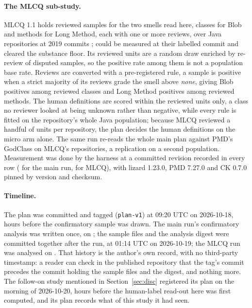 \documentclass[11pt,a4paper]{article}
\begin{document}
\paragraph{The MLCQ sub-study.} MLCQ 1.1 holds \mlcqSamples{} reviewed
samples for the two smells read here, \mlcqBlobReviewed{} classes for Blob
and \mlcqLmReviewed{} methods for Long Method, each with one or more reviews,
over \mlcqRepos{} Java repositories at 2019 commits \cite{mlcq2020}; \mlcqRunDone{}
could be measured at their labelled commit and \mlcqUsable{} cleared the
substance floor. Its reviewed units are a random draw enriched by re-review of
disputed samples, so the positive rate among them is not a population base
rate. Reviews are converted with a pre-registered rule, a sample is positive
when a strict majority of its reviews grade the smell above \emph{none},
giving \mlcqBlob{} Blob positives among \mlcqBlobReviewed{} reviewed classes
and \mlcqLm{} Long Method positives among \mlcqLmReviewed{} reviewed methods.
The human definitions are scored within the reviewed units only, a class no
reviewer looked at being unknown rather than negative, while every rule is
fitted on the repository's whole Java population; because MLCQ reviewed a
handful of units per repository, the plan decides the human definitions on
the micro arm alone. The same run re-reads the whole main plan against PMD's
GodClass on MLCQ's repositories, a replication on a second population.
Measurement was done by the harness at a committed revision recorded in every
row (\harnessCommit{} for the main run, \mlcqHarnessCommit{} for MLCQ), with
lizard 1.23.0, PMD 7.27.0 and CK 0.7.0 pinned by version and checksum.

\paragraph{Timeline.} The plan was committed and tagged (\texttt{plan-v1}) at
09:20 UTC on 2026-10-18, hours before the confirmatory sample was drawn. The
main run's confirmatory analysis was written once, on \analysedUtc{}; the
sample files and the analysis digest were committed together after the run,
at 01:14 UTC on 2026-10-19; the MLCQ run was analysed on
\mlcqAnalysedUtc{}. That history is the author's own record, with no
third-party timestamp: a reader can check in the published repository that
the tag's commit precedes the commit holding the sample files and the digest,
and nothing more. The follow-on study mentioned in Section~\ref{sec:disc}
registered its plan on the morning of 2026-10-20, hours before the human-label
read-out here was first computed, and its plan records what of this study it
had seen.
\end{document}
